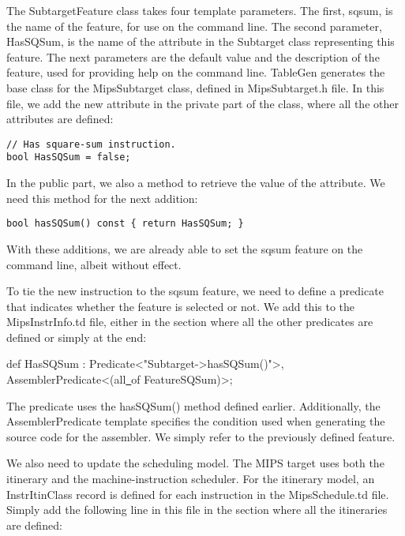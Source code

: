 The SubtargetFeature class takes four template parameters. The first, sqsum, is the name of the feature, for use on the command line. The second parameter, HasSQSum, is the name of the attribute in the Subtarget class representing this feature. The next parameters are the default value and the description of the feature, used for providing help on the command line. TableGen generates the base class for the MipsSubtarget class, defined in MipsSubtarget.h file. In this file, we add the new attribute in the private part of the class, where all the other attributes are defined:\par

\begin{lstlisting}[caption={}]
// Has square-sum instruction.
bool HasSQSum = false;
\end{lstlisting}

In the public part, we also a method to retrieve the value of the attribute. We need this method for the next addition:\par

\begin{lstlisting}[caption={}]
bool hasSQSum() const { return HasSQSum; }
\end{lstlisting}

With these additions, we are already able to set the sqsum feature on the command line, albeit without effect.\par

To tie the new instruction to the sqsum feature, we need to define a predicate that indicates whether the feature is selected or not. We add this to the MipsInstrInfo.td file, either in the section where all the other predicates are defined or simply at the end:\par

\begin{tcolorbox}[colback=white,colframe=black]
def HasSQSum : Predicate<"Subtarget->hasSQSum()">, \\
\hspace*{6cm}AssemblerPredicate<(all\underline{~}of FeatureSQSum)>;
\end{tcolorbox}

The predicate uses the hasSQSum() method defined earlier. Additionally, the AssemblerPredicate template specifies the condition used when generating the source code for the assembler. We simply refer to the previously defined feature.\par

We also need to update the scheduling model. The MIPS target uses both the itinerary and the machine-instruction scheduler. For the itinerary model, an InstrItinClass record is defined for each instruction in the MipsSchedule.td file. Simply add the following line in this file in the section where all the itineraries are defined:\par

